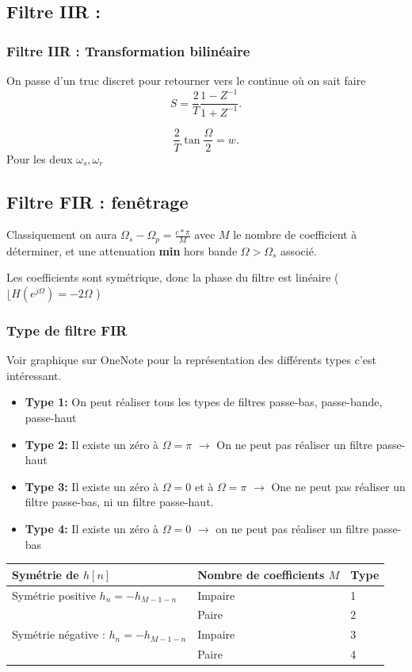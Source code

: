 \documentclass{article}
\theoremstyle{plain}%
\theoremstyle{definition}
\theoremstyle{remark}
\begin{document}
\subsection{Filtre IIR :}
\subsubsection{Filtre IIR : Transformation bilinéaire}
On passe d'un truc discret pour retourner vers le continue où on sait faire 
\[
    S = \frac{2}{T} \frac{1 - Z^{-1}}{1 + Z^{-1}}
    .\]
    
    \[
        \frac{2}{T} \tan \frac{\Omega }{2} = w
        .\]
        Pour les deux $ \omega _s, \omega _r $ 
        
\subsection{Filtre FIR : fenêtrage}
Classiquement on aura $ \Omega _s - \Omega _p = \frac{c*\pi }{M} $ avec $ M $ le nombre de coefficient à déterminer, et une attenuation \textbf{min} hors bande $ \Omega > \Omega _s $ associé.

Les coefficients sont symétrique, donc la phase du filtre est linéaire ($ \lfloor H(e^{j \Omega }) = -2 \Omega $ )

\subsubsection{Type de filtre FIR}
Voir graphique sur OneNote pour la représentation des différents types c'est intéressant.
\begin{itemize}
    \item \textbf{Type 1:} On peut réaliser tous les types de filtres passe-bas, passe-bande, passe-haut
    \item \textbf{Type 2:} Il existe un zéro à $ \Omega = \pi  $ $\rightarrow$ On ne peut pas réaliser un filtre passe-haut
    \item \textbf{Type 3:} Il existe un zéro à $ \Omega = 0 $ et à $ \Omega = \pi  $ $\rightarrow$ One ne peut pas réaliser un filtre passe-bas, ni un filtre passe-haut.
    \item \textbf{Type 4:} Il existe un zéro à $ \Omega = 0 $ $\rightarrow$ on ne peut pas réaliser un filtre passe-bas
\end{itemize}
\begin{table}[!ht]
    \centering
    \begin{tabular}{|l|l|l|}
    \hline
        Symétrie de $h[n]$ & Nombre de coefficients $M$ & Type \\ \hline
        Symétrie positive $ h_n = - h_{M-1-n} $ & Impaire & 1 \\ \hline
        ~ & Paire & 2 \\ \hline
        Symétrie négative : $ h_n = - h_{M-1-n} $  & Impaire & 3 \\ \hline
        ~ & Paire & 4 \\ \hline
    \end{tabular}
\end{table}
\end{document}
